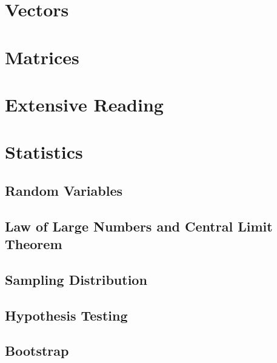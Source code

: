 \ifdefined\printmath

\part{Vectors}







\part{Matrices}




\part{Extensive Reading}



\part{Statistics}
\chapter{Random Variables}


\chapter{Law of Large Numbers and Central Limit Theorem}


\chapter{Sampling Distribution}


\chapter{Hypothesis Testing}


\chapter{Bootstrap}

\fi
